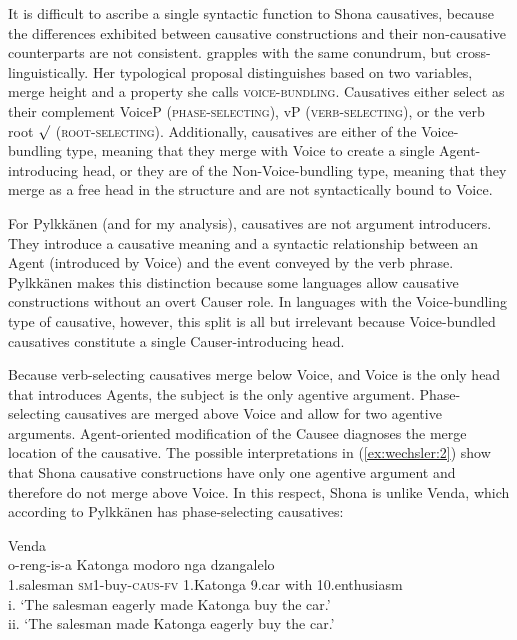 \documentclass[output=paper,modfonts,nonflat]{langsci/langscibook}
\begin{document}
It is difficult to ascribe a single syntactic function to Shona causatives, because the differences exhibited between causative constructions and their non-causative counterparts are not consistent. \citet{Pylkkänen2008} grapples with the same conundrum, but cross-linguistically. Her typological proposal distinguishes based on two variables, merge height and a property she calls \textsc{voice-bundling.} Causatives either select as their complement VoiceP  (\textsc{phase-selecting)}, vP \textsc{(verb-selecting)}, or the verb root ${\surd}$ (\textsc{root-selecting)}. Additionally, causatives are either of the Voice-bundling type, meaning that they merge with Voice to create a single Agent-introducing head, or they are of the Non-Voice-bundling type, meaning that they merge as a free head in the structure and are not syntactically bound to Voice. 

For Pylkkänen (and for my analysis), causatives are not argument introducers. They introduce a causative meaning and a syntactic relationship between an Agent (introduced by Voice) and the event conveyed by the verb phrase. Pylkkänen makes this distinction because some languages allow causative constructions without an overt Causer role. In languages with the Voice-bundling type of causative, however, this split is all but irrelevant because Voice-bundled causatives constitute a single Causer-introducing head. 

Because verb-selecting causatives merge below Voice, and Voice is the only head that introduces Agents, the subject is the only agentive argument. Phase-selecting causatives are merged above Voice and allow for two agentive arguments. Agent-oriented modification of the Causee diagnoses the merge location of the causative. The possible interpretations in (\ref{ex:wechsler:2}) show that Shona causative constructions have only one agentive argument and therefore do not merge above Voice. In this respect, Shona is unlike Venda, which according to Pylkkänen has phase-selecting causatives:

\ea\label{ex:wechsler:3}
Venda \citep[83]{Pylkkänen2008}\\
 {o-reng-is-a} {Katonga} {modoro} {nga} {dzangalelo}\\
1.salesman \textsc{sm1-}buy\textsc{-caus-fv} 1.Katonga 9.car with 10.enthusiasm\\
\glt i. ‘The salesman eagerly made Katonga buy the car.’\\
ii. ‘The salesman made Katonga eagerly buy the car.’
\z
\end{document}
